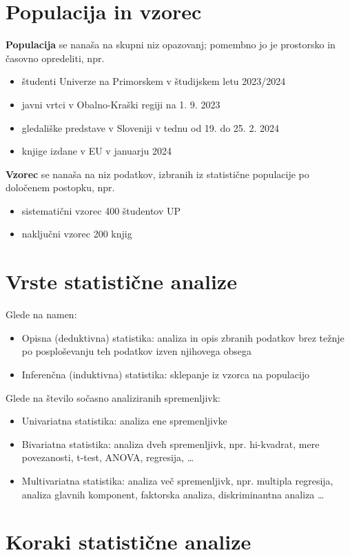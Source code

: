 \section*{Populacija in vzorec}

\textbf{Populacija} se nanaša na skupni niz opazovanj; pomembno jo je prostorsko in časovno opredeliti, npr.
\begin{itemize}
\item študenti Univerze na Primorskem v študijskem letu 2023/2024
\item javni vrtci v Obalno-Kraški regiji na 1. 9. 2023
\item gledališke predstave v Sloveniji v tednu od 19. do 25. 2. 2024
\item knjige izdane v EU v januarju 2024
\end{itemize}
\textbf{Vzorec} se nanaša na niz podatkov, izbranih iz statistične populacije po določenem postopku, npr.
\begin{itemize}
\item sistematični vzorec 400 študentov UP
\item naključni vzorec 200 knjig
\end{itemize}

\section*{Vrste statistične analize}

Glede na namen:
\begin{itemize}
\item Opisna (deduktivna) statistika: analiza in opis zbranih podatkov brez težnje po posploševanju teh podatkov izven njihovega obsega
\item Inferenčna (induktivna) statistika: sklepanje iz vzorca na populacijo
\end{itemize}
Glede na število sočasno analiziranih spremenljivk:
\begin{itemize}
\item Univariatna statistika: analiza ene spremenljivke
\item Bivariatna statistika: analiza dveh spremenljivk, npr. hi-kvadrat, mere povezanosti, t-test, ANOVA, regresija, …
\item Multivariatna statistika: analiza več spremenljivk, npr. multipla regresija, analiza glavnih komponent, faktorska analiza, diskriminantna analiza …
\end{itemize}

\section*{Koraki statistične analize}

